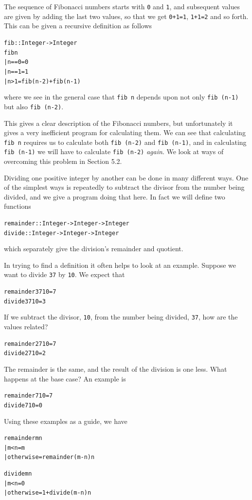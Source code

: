 \begin{example}
The sequence of Fibonacci numbers starts with
\texttt{0} and
\texttt{1},
and subsequent values are given by adding the last two values, so that
we get \texttt{0+1=1}, \texttt{1+1=2} and so forth. This can be given a
recursive definition as follows
\begin{alltt}
fib :: Integer -> Integer
fib n 
  | n==0        = 0
  | n==1        = 1
  | n>1         = fib (n-2) + fib (n-1)
\end{alltt}
where we see in the general case that \texttt{fib n} depends upon not
only \texttt{fib (n-1)} but also \texttt{fib (n-2)}.

This gives a clear description of the Fibonacci numbers, but
unfortunately it gives a very inefficient program for calculating them.
We can see that calculating \texttt{fib n} requires us to calculate both
\texttt{fib (n-2)} and \texttt{fib (n-1)}, and in calculating
\texttt{fib (n-1)} we will have to calculate \texttt{fib (n-2)}
{\em again}. We   look at ways of overcoming this problem in Section 5.2.

Dividing one positive integer by another can be
done in many different ways. One of the simplest ways is
repeatedly to subtract the divisor from the number being
divided,  and we give a program doing that here. In fact we will
define two functions
\begin{alltt}
remainder :: Integer -> Integer -> Integer
divide    :: Integer -> Integer -> Integer
\end{alltt}
which separately give the division's remainder and quotient.

In trying to find a definition it often helps to look at an example.
Suppose we want to divide \texttt{37} by
\texttt{10}. We expect that
\begin{alltt}
remainder 37 10 = 7
divide    37 10 = 3
\end{alltt} 
If we subtract the divisor, \texttt{10}, from the number being divided, \texttt{37}, 
how are the values related?
\begin{alltt}
remainder 27 10 = 7
divide    27 10 = 2
\end{alltt}
The remainder is the same, and the result of the division is one less. 
What happens at the base case? An example is
\begin{alltt}
remainder 7 10 = 7
divide    7 10 = 0
\end{alltt} 
Using these examples as
a guide, we have
\begin{alltt}
remainder m n 
  | m<n         = m
  | otherwise   = remainder (m-n) n
\end{alltt}
\begin{alltt}
divide m n
  | m<n         = 0
  | otherwise   = 1 + divide (m-n) n
\end{alltt}
\end{example}

